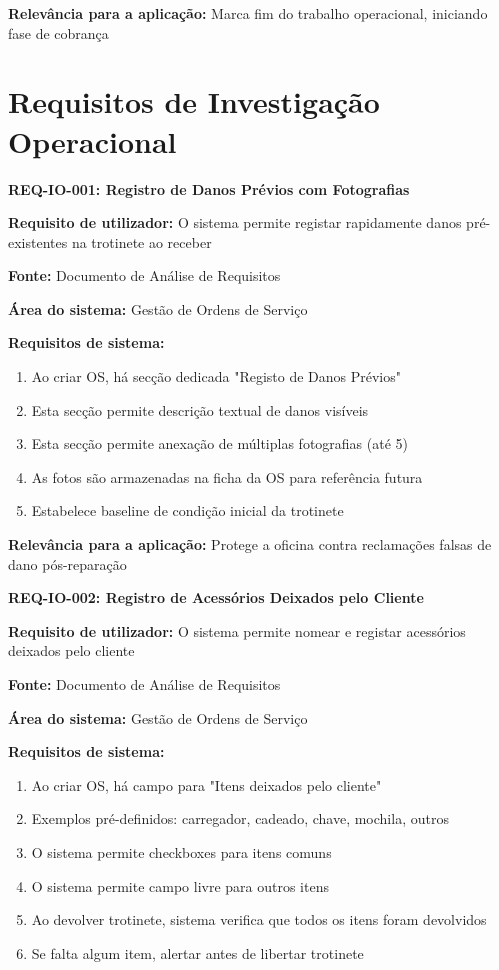 \documentclass[11pt,a4paper]{article}
\newcommand{\reqheader}[1]{{\noindent\large\bfseries\color{sectionblue}#1}\par\vspace{0.3cm}}
\newcommand{\reqfield}[2]{{\noindent\textbf{#1:} #2}\par\vspace{0.2cm}}
\begin{document}
\reqfield{Relevância para a aplicação}{Marca fim do trabalho operacional, iniciando fase de cobrança}

\vspace{1.5cm}


\section*{Requisitos de Investigação Operacional}

\reqheader{REQ-IO-001: Registro de Danos Prévios com Fotografias}

\reqfield{Requisito de utilizador}{O sistema permite registar rapidamente danos pré-existentes na trotinete ao receber}

\reqfield{Fonte}{Documento de Análise de Requisitos}

\reqfield{Área do sistema}{Gestão de Ordens de Serviço}

\reqfield{Requisitos de sistema}{
	\begin{enumerate}
		\item Ao criar OS, há secção dedicada "Registo de Danos Prévios"
		\item Esta secção permite descrição textual de danos visíveis
		\item Esta secção permite anexação de múltiplas fotografias (até 5)
		\item As fotos são armazenadas na ficha da OS para referência futura
		\item Estabelece baseline de condição inicial da trotinete
	\end{enumerate}
}

\reqfield{Relevância para a aplicação}{Protege a oficina contra reclamações falsas de dano pós-reparação}

\vspace{0.8cm}

\reqheader{REQ-IO-002: Registro de Acessórios Deixados pelo Cliente}

\reqfield{Requisito de utilizador}{O sistema permite nomear e registar acessórios deixados pelo cliente}

\reqfield{Fonte}{Documento de Análise de Requisitos}

\reqfield{Área do sistema}{Gestão de Ordens de Serviço}

\reqfield{Requisitos de sistema}{
	\begin{enumerate}
		\item Ao criar OS, há campo para "Itens deixados pelo cliente"
		\item Exemplos pré-definidos: carregador, cadeado, chave, mochila, outros
		\item O sistema permite checkboxes para itens comuns
		\item O sistema permite campo livre para outros itens
		\item Ao devolver trotinete, sistema verifica que todos os itens foram devolvidos
		\item Se falta algum item, alertar antes de libertar trotinete
	\end{enumerate}
}
\end{document}
